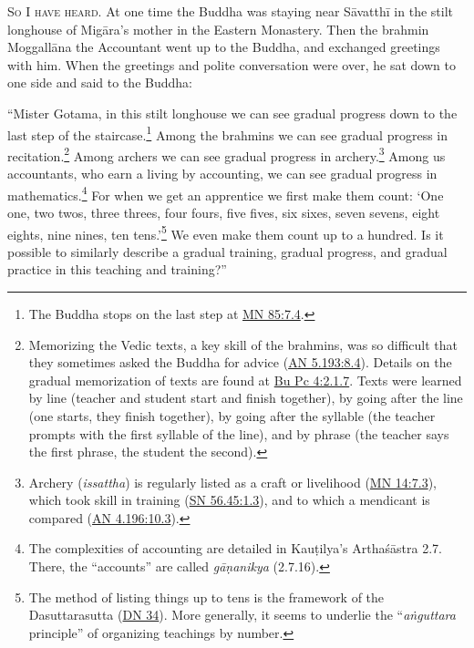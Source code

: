 \documentclass[12pt,openany]{book}%
\newcommand*{\scevam}[1]{\textsc{#1}}
\begin{document}
\scevam{So I have heard. }At one time the Buddha was staying near \textsanskrit{Sāvatthī} in the stilt longhouse of \textsanskrit{Migāra}’s mother in the Eastern Monastery. Then the brahmin \textsanskrit{Moggallāna} the Accountant went up to the Buddha, and exchanged greetings with him. When the greetings and polite conversation were over, he sat down to one side and said to the Buddha: 

“Mister Gotama, in this stilt longhouse we can see gradual progress down to the last step of the staircase.\footnote{The Buddha stops on the last step at \href{https://suttacentral.net/mn85/en/sujato\#7.4}{MN 85:7.4}. } Among the brahmins we can see gradual progress in recitation.\footnote{Memorizing the Vedic texts, a key skill of the brahmins, was so difficult that they sometimes asked the Buddha for advice (\href{https://suttacentral.net/an5.193/en/sujato\#8.4}{AN 5.193:8.4}). Details on the gradual memorization of texts are found at \href{https://suttacentral.net/pli-tv-bu-vb-pc4/en/sujato\#2.1.7}{Bu Pc 4:2.1.7}. Texts were learned by line (teacher and student start and finish together), by going after the line (one starts, they finish together), by going after the syllable (the teacher prompts with the first syllable of the line), and by phrase (the teacher says the first phrase, the student the second). } Among archers we can see gradual progress in archery.\footnote{Archery (\textit{issattha}) is regularly listed as a craft or livelihood (\href{https://suttacentral.net/mn14/en/sujato\#7.3}{MN 14:7.3}), which took skill in training (\href{https://suttacentral.net/sn56.45/en/sujato\#1.3}{SN 56.45:1.3}), and to which a mendicant is compared (\href{https://suttacentral.net/an4.196/en/sujato\#10.3}{AN 4.196:10.3}). } Among us accountants, who earn a living by accounting, we can see gradual progress in mathematics.\footnote{The complexities of accounting are detailed in \textsanskrit{Kauṭilya}’s \textsanskrit{Arthaśāstra} 2.7. There, the “accounts” are called \textit{\textsanskrit{gāṇanikya}} (2.7.16). } For when we get an apprentice we first make them count: ‘One one, two twos, three threes, four fours, five fives, six sixes, seven sevens, eight eights, nine nines, ten tens.’\footnote{The method of listing things up to tens is the framework of the Dasuttarasutta (\href{https://suttacentral.net/dn34/en/sujato}{DN 34}). More generally, it seems to underlie the “\textit{\textsanskrit{aṅguttara}} principle” of organizing teachings by number. } We even make them count up to a hundred. Is it possible to similarly describe a gradual training, gradual progress, and gradual practice in this teaching and training?” 
\end{document}
